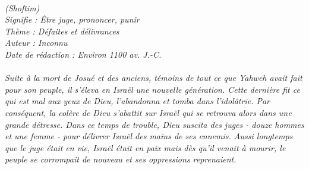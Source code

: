 \BFont
\noindent\hrulefill
{\footnotesize
\textit{
\bigskip
{\centering{}
\\(Shoftim)
\\Signifie : Être juge, prononcer, punir
\\Thème : Défaites et délivrances
\\Auteur : Inconnu
\\Date de rédaction : Environ 1100 av. J.-C.\\}
}
\textit{
\\Suite à la mort de Josué et des anciens, témoins de tout ce que Yahweh avait fait pour son peuple, il s’éleva en Israël une nouvelle génération. Cette dernière fit ce qui est mal aux yeux de Dieu, l’abandonna et tomba dans l’idolâtrie. Par conséquent, la colère de Dieu s’abattit sur Israël qui se retrouva alors dans une grande détresse. Dans ce temps de trouble, Dieu suscita des juges - douze hommes et une femme - pour délivrer Israël des mains de ses ennemis. Aussi longtemps que le juge était en vie, Israël était en paix mais dès qu’il venait à mourir, le peuple se corrompait de nouveau et ses oppressions reprenaient.\bigskip
}
}
\par\nobreak\noindent\hrulefill
